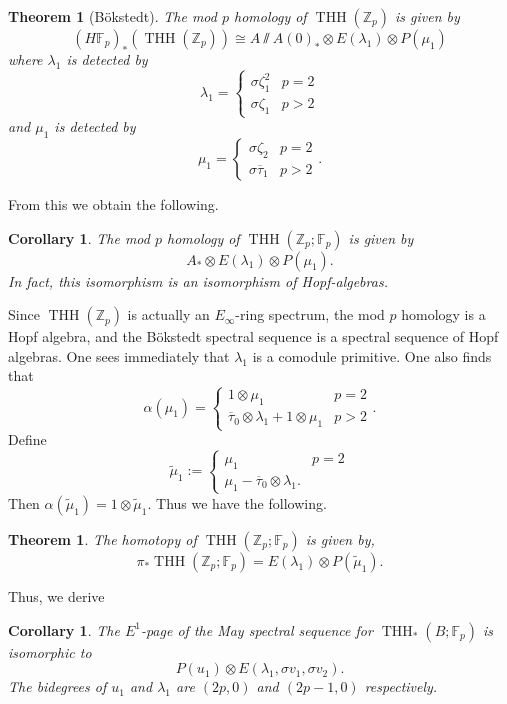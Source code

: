 \documentclass[12pt]{amsart}
\newcommand{\mmod}{\! \sslash \!}
\newcommand{\Z}{\mathbb{Z}}
\newcommand{\F}{\mathbb{F}}
\DeclareMathOperator{\THH}{THH}
\newcommand{\otau}{\overline{\tau}}
\newcommand{\tilmu}{\tilde{\mu}}
\newtheorem{thm}[equation]{Theorem}
\newtheorem{cor}[equation]{Corollary}
\theoremstyle{definition}
\numberwithin{equation}{section}
\numberwithin{figure}{section}
\begin{document}
\begin{thm}[B\"okstedt]
	The mod $p$ homology of $\THH(\Z_p)$ is given by 
	\[
	(H\F_p)_*(\THH(\Z_p))\cong A\mmod A(0)_*\otimes E(\lambda_1)\otimes P(\mu_1)
	\]
	where $\lambda_1$ is detected by 
	\[
	\lambda_1 = \begin{cases}
		\sigma \zeta_1^2 & p=2\\
		\sigma \zeta_1 & p>2
	\end{cases}
	\]
	and $\mu_1$ is detected by 
	\[
	\mu_1 = \begin{cases}
		\sigma \zeta_2 & p=2\\
		\sigma \otau_1 & p>2
	\end{cases}.
	\]
\end{thm}
From this we obtain the following. 

\begin{cor}
	The mod $p$ homology of $\THH(\Z_p;\F_p)$ is given by 
	\[
	A_*\otimes E(\lambda_1)\otimes P(\mu_1).
	\]
	In fact, this isomorphism is an isomorphism of Hopf-algebras. 
\end{cor}

Since $\THH(\Z_p)$ is actually an $E_\infty$-ring spectrum, the mod $p$ homology is a Hopf algebra, and the B\"okstedt spectral sequence is a spectral sequence of Hopf algebras. One sees immediately that $\lambda_1$ is a comodule primitive. One also finds that 
\[
\alpha(\mu_1) = \begin{cases}
	1\otimes \mu_1 & p=2 \\
	\otau_0\otimes \lambda_1+1\otimes \mu_1 & p>2 
\end{cases}.
\]
Define 
\[
\tilmu_1:= \begin{cases}
	\mu_1 & p=2\\
	\mu_1-\otau_0\otimes\lambda_1.
\end{cases}
\]
Then $\alpha(\tilmu_1)=1\otimes \tilmu_1$. Thus we have the following. 
\begin{thm} The homotopy of $\THH(\Z_p;\F_p)$ is given by, 
	\[
\pi_*\THH(\Z_p;\F_p) = E(\lambda_1)\otimes P(\tilmu_1).
	\] 
\end{thm}

Thus, we derive 

\begin{cor}
	The $E^1$-page of the May spectral sequence for $\THH_*(B;\F_p)$ is isomorphic to 
	\[
	P(u_1)\otimes E(\lambda_1, \sigma v_1, \sigma v_2).
	\]
	The bidegrees of $u_1$ and $\lambda_1$ are $(2p,0)$ and $(2p-1,0)$ respectively. 
\end{cor}
\end{document}
